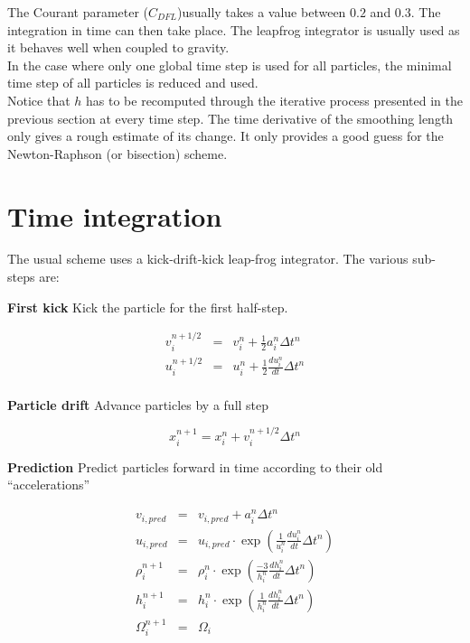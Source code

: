 \documentclass[a4paper,10pt]{report}
\begin{document}
The Courant parameter ($C_{DFL}$)usually takes a value between $0.2$ and $0.3$. The integration in time can then
take place. The
leapfrog integrator is usually used as it behaves well when coupled to gravity. \\
In the case where only one global time step is used for all particles, the minimal time step of all particles is reduced
and used. \\

Notice that $h$ has to be recomputed through the iterative process
presented in the previous section at every time step. The time
derivative of the smoothing length only gives a rough estimate of its
change. It only provides a good guess for the Newton-Raphson (or
bisection) scheme.

\section{Time integration}

The usual scheme uses a kick-drift-kick leap-frog integrator. The various sub-steps are:

\textbf{First kick} Kick the particle for the first half-step.

\begin{eqnarray*}
 v_i^{n+1/2} &=& v_i^{n} + \frac{1}{2} a_i^{n}\Delta t^n \\
 u_i^{n+1/2} &=& u_i^{n} + \frac{1}{2} \frac{du_i^n}{dt}\Delta t^n \\
\end{eqnarray*}

\textbf{Particle drift} Advance particles by a full step

\begin{equation*}
 x_i^{n+1} = x_i^n + v_i^{n+{1/2}} \Delta t^n
\end{equation*}

\textbf{Prediction} Predict particles forward in time according to their old ``accelerations''

\begin{eqnarray*}
 v_{i,pred} &=& v_{i,pred} + a_i^{n} \Delta t^n \\
  u_{i,pred} &=& u_{i,pred} \cdot \exp\left(\frac{1}{u_i^n}\frac{du_i^{n}}{dt} \Delta t^n\right)\\
 \rho_i^{n+1} &=& \rho_i^n \cdot \exp\left(\frac{-3}{h_i^n}  \frac{dh_i^{n}}{dt} \Delta t^n \right) \\
  h_i^{n+1} &=& h_i^n \cdot \exp\left(\frac{1}{h_i^n}  \frac{dh_i^{n}}{dt} \Delta t^n \right)   \\
  \Omega_i^{n+1} &=& \Omega_i
\end{eqnarray*}
\end{document}

